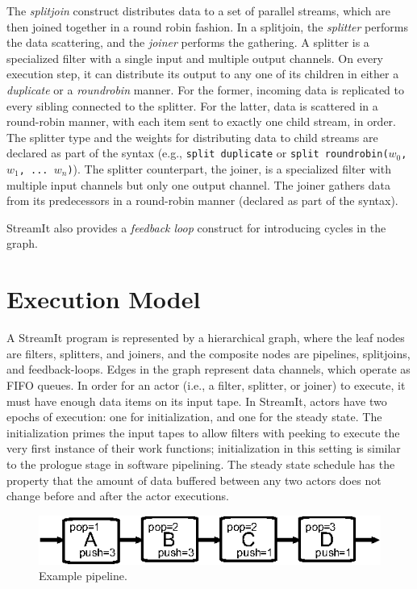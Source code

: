 The {\it splitjoin} construct distributes data to a set of parallel
streams, which are then joined together in a round robin fashion.  In
a splitjoin, the {\it splitter} performs the data scattering, and the
{\it joiner} performs the gathering. A splitter is a specialized
filter with a single input and  multiple output channels. On 
every execution step, it can distribute its output to any one of
its children in either a {\it duplicate} or a {\it roundrobin}
manner. For the former, incoming data is replicated to every
sibling connected to the splitter. For the latter, data is scattered
in a round-robin manner, with each item sent to exactly one child
stream, in order.  The splitter type and the weights for distributing data to
child streams are declared as part of the syntax (e.g., \texttt{split
duplicate} or \texttt{split roundrobin($w_0$, $w_1$, ... $w_n$)}). The
splitter counterpart, the joiner, is a specialized filter with  
multiple input channels but only one output channel. The joiner
gathers data from its predecessors in a round-robin manner (declared
as part of the syntax). 

StreamIt also provides a {\it feedback loop} construct for introducing
cycles in the graph.

\section{Execution Model}
\label{sec:execmodel}

A StreamIt program is represented by a hierarchical graph,
where the leaf nodes are filters, splitters, and joiners, and
the composite nodes are pipelines, splitjoins, and
feedback-loops. Edges in the graph represent data channels, which 
operate as FIFO queues.
In order for an actor  (i.e., a filter,
splitter, or joiner) to execute, it must have enough data items on its input
tape. In StreamIt, actors have  two epochs
of execution: one for initialization, and one for the steady
state. The initialization primes the input tapes to allow filters with
peeking to execute the very first instance of their work functions;
initialization in this setting is similar to the prologue stage in
software pipelining. The steady state schedule has the property that
the amount of data buffered between any two actors does not change
before and after the actor executions.

\begin{figure}[t]
\begin{center}
\vspace{-24pt}
 \includegraphics[scale=1, angle=0]{./pipe-with-rates.eps}
\vspace{-6pt}
 \caption{Example pipeline.}
 \label{fig:pipe-with-rates}
\end{center}
\end{figure}

